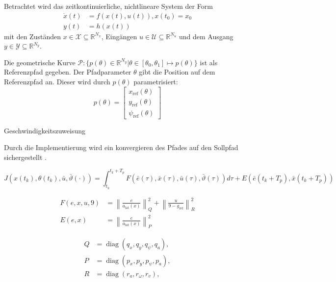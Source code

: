 \noindent Betrachtet wird das zeitkontinuierliche, nichtlineare System der Form 
\begin{align}
    \dot{x}(t)  &= f(x(t),u(t)), x(t_0) = x_0 \\
    y(t)        &= h(x(t)) 
\end{align}
mit den Zuständen $x\in\mathcal{X}\subseteq\mathbb{R}^{N_x}$, Eingängen $u\in\mathcal{U}\subseteq\mathbb{R}^{N_u}$ und dem Ausgang $y\in\mathcal{Y}\subseteq\mathbb{R}^{N_y}$.
 
Die geometrische Kurve $\mathcal{P}:\{p(\theta)\in\mathbb{R}^{N_y}|\theta\in[\theta_0,\theta_1]\mapsto p(\theta)\}$ ist als Referenzpfad gegeben. Der Pfadparameter $\theta$ gibt die Position auf dem Referenzpfad an. Dieser wird durch $p(\theta)$ parametrisiert:
\begin{equation}
    p(\theta) = 
    \begin{bmatrix}
        x_{\text{ref}}(\theta) \\
        y_{\text{ref}}(\theta) \\
        \psi_{\text{ref}}(\theta)
    \end{bmatrix}    
\end{equation}





Geschwindigkeitszuweisung


Durch die Implementierung wird ein konvergieren des Pfades auf den Sollpfad sichergestellt \cite{ritschel2019}.


\begin{equation}
    J(x(t_k),\theta(t_k),\bar{u},\bar{\vartheta}(\cdot)) = \int_{t_k}^{t_k + T_p} F(\bar{e}(\tau),\bar{x}(\tau),\bar{u}(\tau),\bar{\vartheta}(\tau))d\tau + E(\bar{e}(t_k+T_p),\bar{x}(t_k+T_p))
\end{equation}

\begin{align}
    F(e, x, u, 9) &= \left\| \frac{e}{a_{\text{lat}}(x)} \right\|_Q^2 + \left\| \frac{u}{9 - g_{\text{ref}}} \right\|_R^2 \label{eq:F} \\
    E(e, x) &= \left\| \frac{e}{a_{\text{lat}}(x)} \right\|_P^2 \label{eq:E}
\end{align}

\begin{equation}
    \begin{split}
        Q &= \operatorname{diag}(q_x, q_y, q_\psi, q_a), \\
        P &= \operatorname{diag}(p_x, p_y, p_\psi, p_a), \\
        R &= \operatorname{diag}(r_a, r_\omega, r_v),
    \end{split}
\end{equation}





